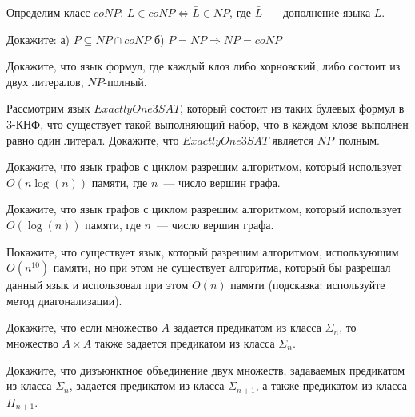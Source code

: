 \setcounter{curtask}{31}


Определим класс $coNP$: $L \in coNP \Leftrightarrow \bar{L} \in NP$, где
$\bar{L}$~--- дополнение языка $L$.


\begin{task}
	Докажите:
    а) $P \subseteq NP \cap coNP$
    б) $P = NP \Rightarrow NP = coNP$
\end{task}

\begin{task}
	Докажите, что язык формул, где каждый клоз либо хорновский, либо состоит из двух
    литералов, $NP$-полный.
\end{task}

\begin{task}
    Рассмотрим язык $Exactly One 3SAT$, который состоит из таких булевых формул в
    $3$-КНФ, что существует такой выполняющий набор, что в каждом клозе выполнен
    равно один литерал. Докажите, что $Exactly One 3SAT$ является $NP$~полным.
\end{task}

\begin{task}
    Докажите, что язык графов с циклом разрешим алгоритмом, который использует $O(n
    \log(n))$ памяти, где $n$~--- число вершин графа.
\end{task}

\begin{task}
    Докажите, что язык графов с циклом разрешим алгоритмом, который использует
    $O(\log(n))$ памяти, где $n$~--- число вершин графа.
\end{task}


\begin{task}
    Покажите, что существует язык, который разрешим алгоритмом, использующим
    $O(n^{10})$ памяти, но при этом не существует алгоритма, который бы разрешал
    данный язык и использовал при этом $O(n)$ памяти (подсказка: используйте метод
    диагонализации).
\end{task}

\breakline


\begin{ptask}{23}
    Докажите, что если множество $A$ задается предикатом из класса $\Sigma_n$, то
    множество $A \times A$ также задается предикатом из класса $\Sigma_n$.
\end{ptask}

\begin{ptask}{24}
    Докажите, что дизъюнктное объединение двух множеств, задаваемых предикатом из
    класса $\Sigma_n$, задается предикатом из класса $\Sigma_{n + 1}$, а также
    предикатом из класса $\Pi_{n + 1}$.
\end{ptask}